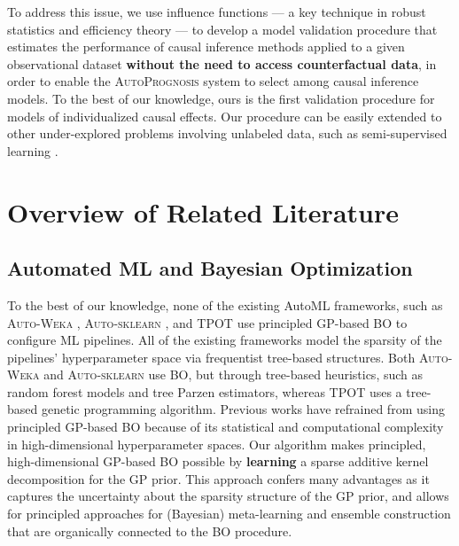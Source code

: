 \documentclass [PhD] {uclathes}
\begin{document}
To address this issue, we use influence functions --- a key technique in robust statistics and efficiency theory \cite{hampel2011robust,robins2008higher} --- to develop a model validation procedure that estimates the performance of causal inference methods applied to a given observational dataset {\bf without the need to access counterfactual data}, in order to enable the {\footnotesize \textsc{AutoPrognosis}} system to select among causal inference models. To the best of our knowledge, ours is the first validation procedure for models of individualized causal effects. Our procedure can be easily extended to other under-explored problems involving unlabeled data, such as semi-supervised learning \cite{oliver2018realistic}.

\section{Overview of Related Literature}
\label{ch4sec1}
\subsection{Automated ML and Bayesian Optimization}
To the best of our knowledge, none of the existing AutoML frameworks, such as {\footnotesize \textsc{Auto-Weka}} \cite{kotthoff2016auto}, {\footnotesize \textsc{Auto-sklearn}} \cite{feurer2015efficient}, and {\footnotesize \textsc{TPOT}} \cite{olson2016tpot} use principled GP-based BO to configure ML pipelines. All of the existing frameworks model the sparsity of the pipelines' hyperparameter space via frequentist tree-based structures. Both {\footnotesize \textsc{Auto-Weka}} and {\footnotesize \textsc{Auto-sklearn}} use BO, but through tree-based heuristics, such as random forest models and tree Parzen estimators, whereas TPOT uses a tree-based genetic programming algorithm. Previous works have refrained from using principled GP-based BO because of its statistical and computational complexity in high-dimensional hyperparameter spaces. Our algorithm makes principled, high-dimensional GP-based BO possible by {\bf learning} a sparse additive kernel decomposition for the GP prior. This approach confers many advantages as it captures the uncertainty about the sparsity structure of the GP prior, and allows for principled approaches for (Bayesian) meta-learning and ensemble construction that are organically connected to the BO procedure. 
\end{document}
